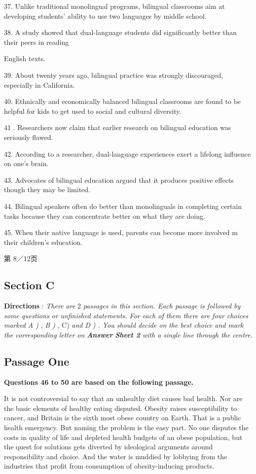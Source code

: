 \documentclass[UTF8,11pt]{ctexart}
\begin{document}
37. Unlike traditional monolingual programs, bilingual classrooms aim at developing students' ability to use two languages by middle school.


38. A study showed that dual-language students did significantly better than their peers in reading


English texts.


39. About twenty years ago, bilingual practice was strongly discouraged, especially in California.


40. Ethnically and economically balanced bilingual classrooms are found to be helpful for kids to get used to social and cultural diversity.


41 . Researchers now claim that earlier research on bilingual education was seriously flawed.


42. According to a researcher, dual-language experiences exert a lifelong influence on one's brain.


43. Advocates of bilingual education argued that it produces positive effects though they may be limited.


44. Bilingual speakers often do better than monolinguals in completing certain tasks because they can concentrate better on what they are doing.


45. When their native language is used, parents can become more involved m their children's education.


第 8／12页


\subsection*{\textbf{Section C}}


\textbf{Directions }: \textit{There are }2 \textit{passages in this section. Each passage is followed by some questions or} \textit{unfinished statements. For each of them there are four choices marked A ) }, \textit{B ) }, C) \textit{and} \textit{D ) . You should decide on the best choice and mark the corresponding letter on }\textbf{\textit{Answer}} \textbf{\textit{Sheet 2 }}\textit{with a single line through the centre.}


\subsection*{\textbf{Passage One}}


\textbf{Questions 46 to 50 are based on the following passage.}


It is not controversial to say that an unhealthy diet causes bad health. Nor are the basic elements of healthy eating disputed. Obesity raises susceptibility to cancer, and Britain is the sixth most obese country on Earth. That is a public health emergency. But naming the problem is the easy part. No one disputes the costs in quality of life and depleted health budgets of an obese population, but the quest for solutions gets diverted by ideological arguments around responsibility and choice. And the water is muddied by lobbying from the industries that profit from consumption of obesity-inducing products.
\end{document}
